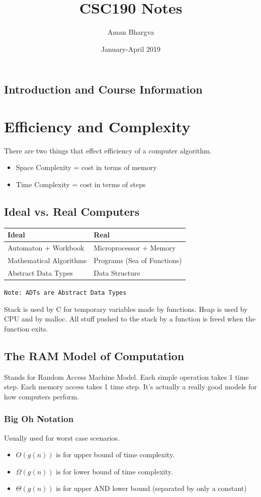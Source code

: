 \documentclass[a4paper,12pt]{report}
\begin{document}
\title{CSC190 Notes}
\author{Aman Bhargva}
\date{January-April 2019}
\maketitle

\tableofcontents

\section{Introduction and Course Information}

\chapter{Efficiency and Complexity}
There are two things that effect efficiency of a computer algorithm.
\begin{itemize}
\item Space Complexity = cost in terms of memory
\item Time Complexity = cost in terms of steps
\end{itemize}

\section{Ideal vs. Real Computers}
\begin{tabular}{l|l}
Ideal & Real \\
\hline
Automaton + Workbook & Microprocessor + Memory \\
Mathematical Algorithms & Programs (Sea of Functions) \\
Abstract Data Types & Data Structure 
\end{tabular}

\texttt{Note: ADTs are Abstract Data Types}

Stack is used by C for temporary variables made by functions. Heap is used by CPU and by malloc. All stuff pushed to the stack by a function is freed when the function exits. 

\section{The RAM Model of Computation}
Stands for Random Access Machine Model.
Each simple operation takes 1 time step. Each memory access takes 1 time step. It's actually a really good models for how computers perform.

\subsection{Big Oh Notation}
Usually used for worst case scenarios.
\begin{itemize}
\item $O(g(n))$ is for upper bound of time complexity.
\item $\Omega(g(n))$ is for lower bound of time complexity.
\item $\Theta(g(n))$ is for upper AND lower bound (separated by only a constant)
\end{itemize}
\end{document}
